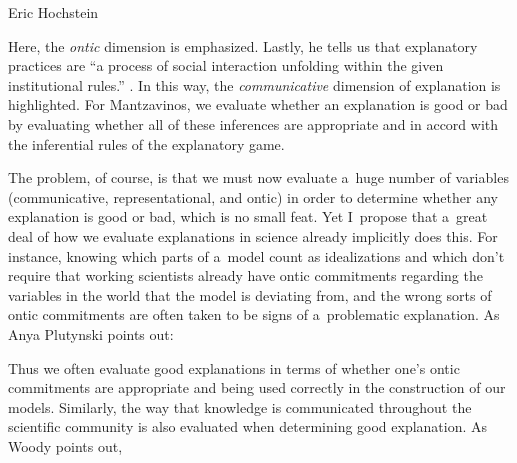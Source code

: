 \begin{artengenv}{Eric Hochstein}

Here, the \textit{ontic} dimension is emphasized. Lastly, he tells us that explanatory practices are ``a process of social interaction unfolding within the given institutional rules.''
\parencite[][p.68]{mantzavinos_explanatory_2016}. %
 In this way, the \textit{communicative} dimension of explanation is highlighted. For Mantzavinos, we evaluate whether an explanation is good or bad by evaluating whether all of these inferences are appropriate and in accord with the inferential rules of the explanatory game.

The problem, of course, is that we must now evaluate a~huge number of variables (communicative, representational, and ontic) in order to determine whether any explanation is good or bad, which is no small feat. Yet I~propose that a~great deal of how we evaluate explanations in science already implicitly does this. For instance, knowing which parts of a~model count as idealizations and which don't require that working scientists already have ontic commitments regarding the variables in the world that the model is deviating from, and the wrong sorts of ontic commitments are often taken to be signs of a~problematic explanation. As Anya Plutynski
\parencite*[][p.472]{plutynski_cancer_2013} %
 points out:


Thus we often evaluate good explanations in terms of whether one's ontic commitments are appropriate and being used correctly in the construction of our models. Similarly, the way that knowledge is communicated throughout the scientific community is also evaluated when determining good explanation. As Woody
\parencite*[][p.85]{woody_re-orienting_2015} %
 points out,


\end{artengenv}
